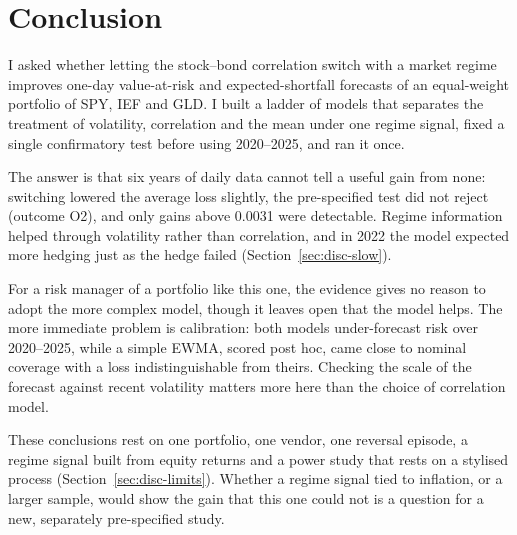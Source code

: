 \section{Conclusion}\label{ch:conclusion}

I asked whether letting the stock--bond correlation switch with a market regime improves one-day value-at-risk and expected-shortfall forecasts of an equal-weight portfolio of SPY, IEF and GLD. I built a ladder of models that separates the treatment of volatility, correlation and the mean under one regime signal, fixed a single confirmatory test before using 2020--2025, and ran it once.

The answer is that six years of daily data cannot tell a useful gain from none: switching lowered the average loss slightly, the pre-specified test did not reject (outcome O2), and only gains above 0.0031 were detectable. Regime information helped through volatility rather than correlation, and in 2022 the model expected more hedging just as the hedge failed (Section~\ref{sec:disc-slow}).

For a risk manager of a portfolio like this one, the evidence gives no reason to adopt the more complex model, though it leaves open that the model helps. The more immediate problem is calibration: both models under-forecast risk over 2020--2025, while a simple EWMA, scored post hoc, came close to nominal coverage with a loss indistinguishable from theirs. Checking the scale of the forecast against recent volatility matters more here than the choice of correlation model.

These conclusions rest on one portfolio, one vendor, one reversal episode, a regime signal built from equity returns and a power study that rests on a stylised process (Section~\ref{sec:disc-limits}). Whether a regime signal tied to inflation, or a larger sample, would show the gain that this one could not is a question for a new, separately pre-specified study.

